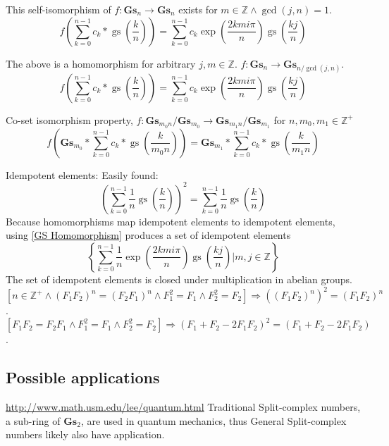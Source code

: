\documentclass[]{article}
\DeclareMathOperator{\gs}{gs}
\newcommand{\pqty}[1]{{\left(#1\right)}}
\newcommand{\Bqty}[1]{{\left\{#1\right\}}}
\newcommand{\bqty}[1]{{\left[#1\right]}}
\begin{document}
	This self-isomorphism of $f:\mathbf{Gs}_n\rightarrow\mathbf{Gs}_n$ exists for $m\in\mathbb{Z}\land\gcd\pqty{j,n}=1$.
	\begin{equation}
	f\pqty{\sum_{k=0}^{n-1} c_k*\gs\pqty{\frac{k}{n}}}=\sum_{k=0}^{n-1} c_k\exp\pqty{\frac{2kmi\pi}{n}}\gs\pqty{\frac{kj}{n}}
	\end{equation}
	
	The above is a homomorphism for arbitrary $j,m\in\mathbb{Z}$. $f:\mathbf{Gs}_n\rightarrow\mathbf{Gs}_{n/\gcd\pqty{j,n}}$.
	\begin{equation}
	\label{GS Homomorphism}
	f\pqty{\sum_{k=0}^{n-1} c_k*\gs\pqty{\frac{k}{n}}}=\sum_{k=0}^{n-1} c_k\exp\pqty{\frac{2kmi\pi}{n}}\gs\pqty{\frac{kj}{n}}
	\end{equation}
	
	Co-set isomorphism property, $f:\mathbf{Gs}_{m_0n}/\mathbf{Gs}_{m_0}\rightarrow \mathbf{Gs}_{m_1n}/\mathbf{Gs}_{m_1}$ for $n,m_0,m_1\in\mathbb{Z}^+$
	\begin{equation}
	f\pqty{\mathbf{Gs}_{m_0}*\sum_{k=0}^{n-1} c_k*\gs\pqty{\frac{k}{m_0n}}}=\mathbf{Gs}_{m_1}*\sum_{k=0}^{n-1} c_k*\gs\pqty{\frac{k}{m_1n}}
	\end{equation}
	
	Idempotent elements: Easily found:
	\begin{equation}
	\pqty{\sum_{k=0}^{n-1}\frac{1}{n}\gs\pqty{\frac{k}{n}}}^2
	=
	\sum_{k=0}^{n-1}\frac{1}{n}\gs\pqty{\frac{k}{n}}
	\end{equation}
	Because homomorphisms map idempotent elements to idempotent elements, using \eqref{GS Homomorphism} produces a set of idempotent elements
	\begin{equation}
	\Bqty{ \sum_{k=0}^{n-1} \frac{1}{n}\exp\pqty{\frac{2kmi\pi}{n}}\gs\pqty{\frac{kj}{n}} \Bigg\vert m,j\in\mathbb{Z} }
	\end{equation}
	The set of idempotent elements is closed under multiplication in abelian groups.
	\begin{equation}
	\bqty{n\in\mathbb{Z}^+\land\pqty{F_1F_2}^n=\pqty{F_2F_1}^n\land F_1^2=F_1\land F_2^2=F_2}\Rightarrow \pqty{\pqty{F_1F_2}^n}^2=\pqty{F_1F_2}^n
	\end{equation}.
	\begin{equation}
	\bqty{F_1F_2=F_2F_1\land F_1^2=F_1\land F_2^2=F_2}\Rightarrow \pqty{{F_1+F_2-2F_1F_2}}^2=\pqty{F_1+F_2-2F_1F_2}
	\end{equation}.
	
	\subsection{Possible applications}
	\url{http://www.math.usm.edu/lee/quantum.html} Traditional Split-complex numbers, a sub-ring of $\mathbf{Gs}_2$, are used in quantum mechanics, thus General Split-complex numbers likely also have application.
	
\end{document}
